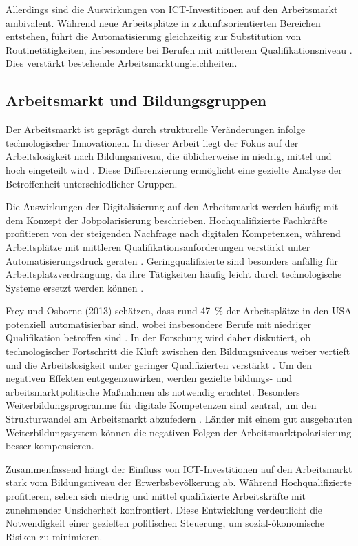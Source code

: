 Allerdings sind die Auswirkungen von \ac{ICT}-Investitionen auf den Arbeitsmarkt 
ambivalent. Während neue Arbeitsplätze in zukunftsorientierten Bereichen entstehen, führt 
die Automatisierung gleichzeitig zur Substitution von Routinetätigkeiten, insbesondere 
bei Berufen mit mittlerem Qualifikationsniveau \parencite[vgl.][S. 40]{frey2013thefuture}. 
Dies verstärkt bestehende Arbeitsmarktungleichheiten.


\subsection{Arbeitsmarkt und Bildungsgruppen}

Der Arbeitsmarkt ist geprägt durch strukturelle Veränderungen infolge technologischer 
Innovationen. In dieser Arbeit liegt der Fokus auf der Arbeitslosigkeit nach 
Bildungsniveau, die üblicherweise in niedrig, mittel und hoch eingeteilt wird 
\parencite[vgl.][S. 35–37]{frey2013thefuture}. Diese Differenzierung ermöglicht eine 
gezielte Analyse der Betroffenheit unterschiedlicher Gruppen.

Die Auswirkungen der Digitalisierung auf den Arbeitsmarkt werden häufig mit dem Konzept 
der Jobpolarisierung beschrieben. Hochqualifizierte Fachkräfte profitieren von der 
steigenden Nachfrage nach digitalen Kompetenzen, während Arbeitsplätze mit mittleren 
Qualifikationsanforderungen verstärkt unter Automatisierungsdruck geraten 
\parencite[vgl.][S. 40]{autor2015whyare}. Geringqualifizierte sind besonders anfällig für 
Arbeitsplatzverdrängung, da ihre Tätigkeiten häufig leicht durch technologische Systeme 
ersetzt werden können \parencite[vgl.][S. 10]{acemoglu2002technical}.

Frey und Osborne (2013) schätzen, dass rund 47~\% der Arbeitsplätze in den USA potenziell 
automatisierbar sind, wobei insbesondere Berufe mit niedriger Qualifikation betroffen sind 
\parencite[vgl.][S. 14–15]{frey2013thefuture}. In der Forschung wird daher diskutiert, ob 
technologischer Fortschritt die Kluft zwischen den Bildungsniveaus weiter vertieft und die 
Arbeitslosigkeit unter geringer Qualifizierten verstärkt 
\parencite[vgl.][S. 2–4]{balsmeier2019isthis}. Um den negativen Effekten entgegenzuwirken, 
werden gezielte bildungs- und arbeitsmarktpolitische Maßnahmen als notwendig erachtet. 
Besonders Weiterbildungsprogramme für digitale Kompetenzen sind zentral, um den 
Strukturwandel am Arbeitsmarkt abzufedern \parencite[vgl.][S. 75]{brynjolfsson2014thesecond}. 
Länder mit einem gut ausgebauten Weiterbildungssystem können die negativen Folgen der 
Arbeitsmarktpolarisierung besser kompensieren.

Zusammenfassend hängt der Einfluss von \ac{ICT}-Investitionen auf den Arbeitsmarkt stark 
vom Bildungsniveau der Erwerbsbevölkerung ab. Während Hochqualifizierte profitieren, 
sehen sich niedrig und mittel qualifizierte Arbeitskräfte mit zunehmender Unsicherheit 
konfrontiert. Diese Entwicklung verdeutlicht die Notwendigkeit einer gezielten 
politischen Steuerung, um sozial-ökonomische Risiken zu minimieren.
